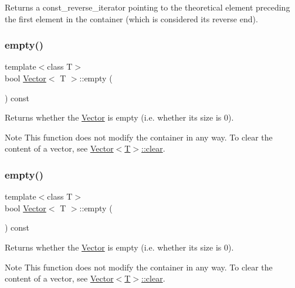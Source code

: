 Returns a const\+\_\+reverse\+\_\+iterator pointing to the theoretical element preceding the first element in the container (which is considered its reverse end). \mbox{\label{classVector_ad688a8a0dfbd07ea63d838058a436f79}} 
\subsubsection{\texorpdfstring{empty()}{empty()}\hspace{0.1cm}{\footnotesize\ttfamily [1/2]}}
{\footnotesize\ttfamily template$<$class T$>$ \\
bool \hyperlink{classVector}{Vector}$<$ T $>$\+::empty (\begin{DoxyParamCaption}{ }\end{DoxyParamCaption}) const\hspace{0.3cm}{\ttfamily [inline]}}



Returns whether the \hyperlink{classVector}{Vector} is empty (i.\+e. whether its size is 0). 

\begin{DoxyNote}{Note}
This function does not modify the container in any way. To clear the content of a vector, see \hyperlink{classVector_a32ad98b135472b0ebc5d6cb3ae5d0085}{Vector$<$\+T$>$\+::clear}. 
\end{DoxyNote}
\mbox{\label{classVector_ad688a8a0dfbd07ea63d838058a436f79}} 
\subsubsection{\texorpdfstring{empty()}{empty()}\hspace{0.1cm}{\footnotesize\ttfamily [2/2]}}
{\footnotesize\ttfamily template$<$class T$>$ \\
bool \hyperlink{classVector}{Vector}$<$ T $>$\+::empty (\begin{DoxyParamCaption}{ }\end{DoxyParamCaption}) const\hspace{0.3cm}{\ttfamily [inline]}}



Returns whether the \hyperlink{classVector}{Vector} is empty (i.\+e. whether its size is 0). 

\begin{DoxyNote}{Note}
This function does not modify the container in any way. To clear the content of a vector, see \hyperlink{classVector_a32ad98b135472b0ebc5d6cb3ae5d0085}{Vector$<$\+T$>$\+::clear}. 
\end{DoxyNote}
\mbox{\label{classVector_ae288fa619188bff101d5300b8aaf9a90}} 
